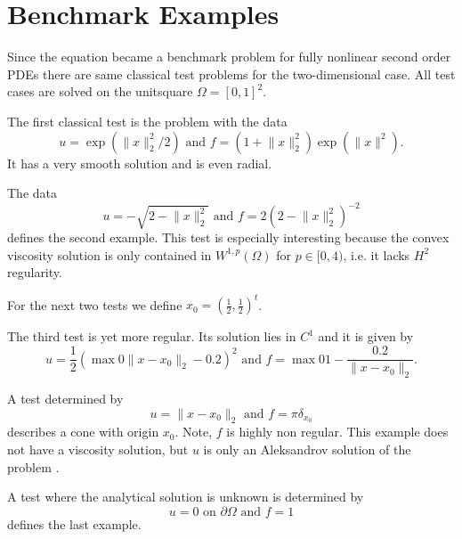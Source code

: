 \section{Benchmark Examples}

Since the \MA equation became a benchmark problem for fully nonlinear second order PDEs there are same classical test problems for the two-dimensional case. All test cases are solved on the unitsquare $\Omega=[0,1]^2$.

\begin{test} \label{test smooth}
The first classical \MA test is the problem with the data
\[
	u=\exp( \lVert x \rVert_2^2  /2) 
	\text { and } 
	f = (1 + \lVert x \rVert_2^2) \exp( \lVert x \rVert^2).
\]
It has a very smooth solution and is even radial.

\end{test}

\begin{test}\label{test sqrt}
The data
\[
	u = - \sqrt{ 2-  \lVert x \rVert_2^2}
	\text { and } 
	f = 2\left( 2-  \lVert x \rVert_2^2 \right)^{-2}
\]
defines the second example. This test is especially interesting because the convex viscosity solution is only contained in $W^{1,p}(\Omega) $ for $p \in [0,4)$\cite{DG2006a}, i.e. it lacks $H^2$ regularity.
\end{test}

For the next two tests we define $x_0 = \left(\frac 1 2, \frac 1 2  \right)^t$.

\begin{test}\label{test singularity}
The third \MA test is yet more regular. Its solution lies in $C^1$ and it is given by
\[
	u=\frac 1 2 \left( \max 0 {\lVert x - x_0 \rVert_2-0.2 }  \right)^2 
	\text { and } 
	f = \max 0 {1-\frac {0.2} {\lVert x - x_0 \rVert_2} }.
\]
\end{test}


\begin{test}\label{test dirac}
A test determined by
\[
	u = \lVert x - x_0 \rVert_2
	\text { and } 
	f = \pi \delta_{x_0}
\]
describes a cone with origin $x_0$. Note, $f$ is highly non regular. This example does not have a viscosity solution, but $u$ is only an Aleksandrov solution of the problem \cite[Section 2.3.]{FO2011}.
\end{test}


\begin{test}\label{test rhsConst}
A test where the analytical solution is unknown is determined by
\[
	u = 0 \text{ on } \partial \Omega
	\text { and } 
	f = 1
\]
defines the last example.
\end{test}


